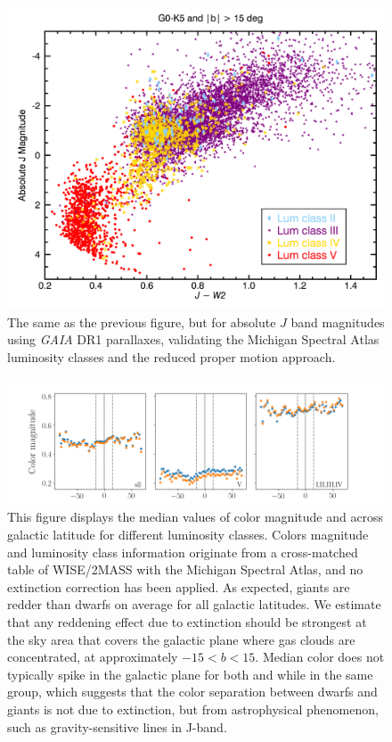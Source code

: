 \begin{figure}[t]
    \label{fig:absolute_j_jw2}

  \begin{center}
      \includegraphics[width=1.0\textwidth,clip=true]{Figures/absolute_j/plot-J-W2-G0-K5-b15-1.png}
 \end{center}
 \caption{The same as the previous figure, but for absolute $J$ band magnitudes using \textit{GAIA} DR1 parallaxes, validating the Michigan Spectral Atlas luminosity classes and the reduced proper motion approach.}
\end{figure}

\begin{figure}
    \centering
    \includegraphics[width=1.0\textwidth,clip=true]{Figures/populations/plot-b-vs-color.png}
    \caption{This figure displays the median values of color magnitude \jwone and \jwtwo across galactic latitude for different luminosity classes. Colors magnitude and luminosity class information originate from a cross-matched table of WISE/2MASS with the Michigan Spectral Atlas, and no extinction correction has been applied. As expected, giants are redder than dwarfs on average for all galactic latitudes. We estimate that any reddening effect due to extinction should be strongest at the sky area that covers the galactic plane where gas clouds are concentrated, at approximately $-15<b<15$. Median color does not typically spike in the galactic plane for both \jwone and \jwtwo while in the same group, which suggests that the color separation between dwarfs and giants is not due to extinction, but from astrophysical phenomenon, such as gravity-sensitive lines in J-band.}
    \label{fig:color-vs-b}
\end{figure}